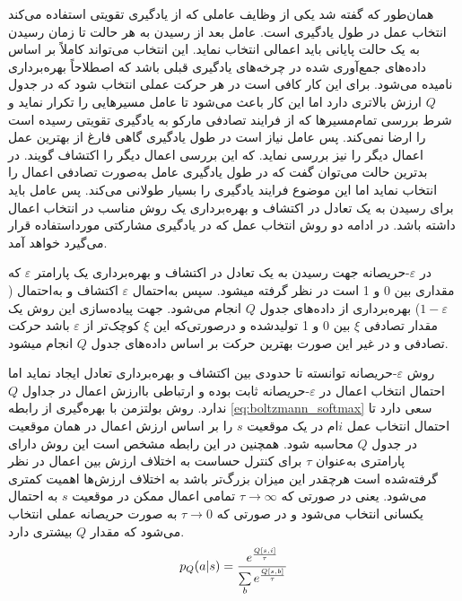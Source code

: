 همان‌طور که گفته شد یکی از وظایف عاملی که از یادگیری تقویتی استفاده می‌کند انتخاب عمل در طول یادگیری است. عامل بعد از رسیدن به هر حالت تا زمان رسیدن به یک حالت پایانی باید اعمالی انتخاب نماید. این انتخاب می‌تواند کاملاً بر اساس داده‌های جمع‌آوری شده در چرخه‌های یادگیری قبلی باشد که اصطلاحاً بهره‌برداری نامیده می‌شود. برای این کار کافی است در هر حرکت عملی انتخاب شود که در جدول $Q$ ارزش بالاتری دارد اما این کار باعث می‌شود تا عامل مسیرهایی را تکرار نماید و شرط بررسی تمام‌مسیرها که از فرایند تصادفی مارکو به یادگیری تقویتی رسیده است را ارضا نمی‌کند. پس عامل نیاز است در طول یادگیری گاهی فارغ از بهترین عمل اعمال دیگر را نیز بررسی نماید. که این بررسی اعمال دیگر را اکتشاف گویند. در بدترین حالت می‌توان گفت که در طول یادگیری عامل به‌صورت تصادفی اعمال را انتخاب نماید اما این موضوع فرایند یادگیری را بسیار طولانی می‌کند. پس عامل باید برای رسیدن به یک تعادل در اکتشاف و بهره‌برداری یک روش مناسب در انتخاب اعمال داشته باشد. در ادامه دو روش انتخاب عمل که در یادگیری مشارکتی مورداستفاده قرار می‌گیرد خواهد آمد.

در $\varepsilon$-حریصانه جهت رسیدن به یک تعادل در اکتشاف و بهره‌برداری یک پارامتر $\varepsilon$ که مقداری بین 0 و 1 است در نظر گرفته میشود. سپس به‌احتمال $\varepsilon$ اکتشاف و به‌احتمال
($1 - \varepsilon$)
بهره‌برداری از داده‌های جدول $Q$ انجام می‌شود. جهت پیاده‌سازی این روش یک مقدار تصادفی  $\xi$ بین 0 و 1 تولیدشده و درصورتی‌که این $\xi$ کوچک‌تر از $\varepsilon$ باشد حرکت تصادفی و در غیر این صورت بهترین حرکت بر اساس داده‌های جدول $Q$ انجام میشود.

روش $\varepsilon$-حریصانه توانسته تا حدودی بین اکتشاف و بهره‌برداری تعادل ایجاد نماید اما احتمال انتخاب اعمال در $\varepsilon$-حریصانه ثابت بوده و ارتباطی باارزش اعمال در جداول $Q$ ندارد. روش بولتزمن با بهره‌گیری از رابطه \ref{eq:boltzmann_softmax} سعی دارد تا احتمال انتخاب عمل $i$ام در یک موقعیت $s$ را بر اساس ارزش اعمال در همان موقعیت در جدول $Q$ محاسبه شود. همچنین در این رابطه مشخص است این روش دارای پارامتری به‌عنوان $\tau$ برای کنترل حساست به اختلاف ارزش بین اعمال در نظر گرفته‌شده است هرچقدر این میزان بزرگ‌تر باشد به اختلاف ارزش‌ها اهمیت کمتری می‌شود. یعنی در صورتی که $\tau \rightarrow \infty$ تمامی اعمال ممکن در موقعیت $s$ به احتمال یکسانی انتخاب می‌شود و در صورتی که $\tau \rightarrow 0$ به صورت حریصانه عملی انتخاب می‌شود که مقدار $Q$ بیشتری دارد.
\begin{equation}\label{eq:boltzmann_softmax}
p_{Q}(a | s) = {e^{Q[s, i] \over \tau} \over \sum\limits_b e^{Q[s, b] \over \tau}}
\end{equation}
